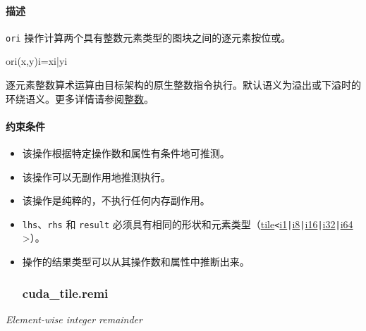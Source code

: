 \documentclass{article}
\begin{document}
\begin{itemize}
\paragraph{描述}


\end{itemize}
\texttt{ori} 操作计算两个具有整数元素类型的图块之间的逐元素按位或。



ori(x,y)i=xi|yi


逐元素整数算术运算由目标架构的原生整数指令执行。默认语义为溢出或下溢时的环绕语义。更多详情请参阅\href{https://docs.nvidia.com/cuda/tile-ir/latest/sections/operations.html#op-group-integer}{整数}。





\paragraph{约束条件}


\begin{itemize}
\item 该操作根据特定操作数和属性有条件地可推测。
\item 该操作可以无副作用地推测执行。
\item 该操作是纯粹的，不执行任何内存副作用。
\item \texttt{lhs}、\texttt{rhs} 和 \texttt{result} 必须具有相同的形状和元素类型（\href{https://docs.nvidia.com/cuda/tile-ir/latest/sections/types.html#type-tile}{tile}\texttt{<}\href{https://docs.nvidia.com/cuda/tile-ir/latest/sections/types.html#subsection-element-types}{i1}\texttt{|}\href{https://docs.nvidia.com/cuda/tile-ir/latest/sections/types.html#subsection-element-types}{i8}\texttt{|}\href{https://docs.nvidia.com/cuda/tile-ir/latest/sections/types.html#subsection-element-types}{i16}\texttt{|}\href{https://docs.nvidia.com/cuda/tile-ir/latest/sections/types.html#subsection-element-types}{i32}\texttt{|}\href{https://docs.nvidia.com/cuda/tile-ir/latest/sections/types.html#subsection-element-types}{i64} >）。
\item 操作的结果类型可以从其操作数和属性中推断出来。




\subsubsection{cuda\_tile.remi}


\end{itemize}
\textit{Element-wise integer remainder}
\end{document}
